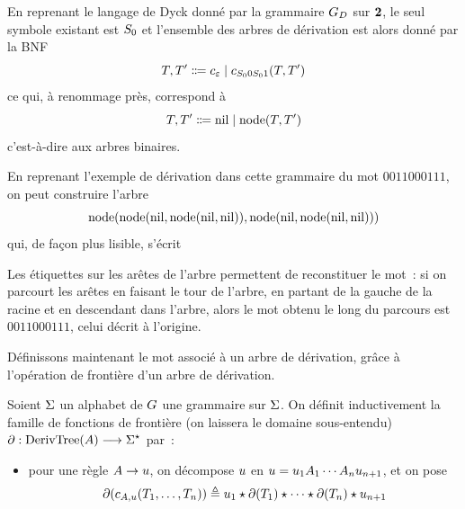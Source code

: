 \begin{example}
  En reprenant le langage de Dyck donné par la grammaire $G_D$ sur
  $\bm{2}$, le seul symbole existant est $S_{0}$ et l'ensemble des arbres de
  dérivation est alors donné par la BNF
  \[T,T' \inddefeq c_{\Ewd} \mid c_{\StGr 0\StGr 1}(T,T')\]
  ce qui, à renommage près, correspond à
  \[T,T' \inddefeq \nil\mid \node(T,T')\]
  c'est-à-dire aux arbres binaires.

  En reprenant l'exemple de dérivation dans cette grammaire du mot
  $0011000111$, on peut construire l'arbre
  \[\operatorname{node}(\operatorname{node}(\operatorname{nil},\operatorname{node}(\operatorname{nil},\operatorname{nil})),\operatorname{node}(\operatorname{nil},\operatorname{node}(\operatorname{nil},\operatorname{nil})))\]
  qui, de façon plus lisible, s'écrit
  \begin{center}
  \end{center}
  Les étiquettes sur les arêtes de l'arbre permettent de reconstituer le mot~:
  si on parcourt les arêtes en faisant le tour de l'arbre, en partant de la
  gauche de la racine et en descendant dans l'arbre, alors le mot obtenu le long
  du parcours est $0011000111$, celui décrit à l'origine.
\end{example}

Définissons maintenant le mot associé à un arbre de dérivation, grâce à
l'opération de frontière d'un arbre de dérivation.

\begin{definition}
  Soient $\Sigma$ un alphabet de $G$ une grammaire sur $\Sigma$. On définit
  inductivement la famille de fonctions de frontière (on laissera le domaine
  sous-entendu) $\mathbin{\partial} : \displaystyle \operatorname{DerivTree}(A) \longrightarrow \Sigma^{\star}$ par~:
  \begin{itemize}
  \item pour une règle $A \to u$, on décompose $u$ en
    $u = u_1 A_1\cdots A_nu_{n+1}$, et on pose
    \[\mathbin{\partial}(c_{A,u}(T_1,\ldots,T_n)) \triangleq
    u_1 \mathbin{\star} \mathbin{\partial}(T_1)\mathbin{\star}\cdots\mathbin{\star} \mathbin{\partial}(T_n)\mathbin{\star}u_{n+1}\]
  \end{itemize}
\end{definition}

